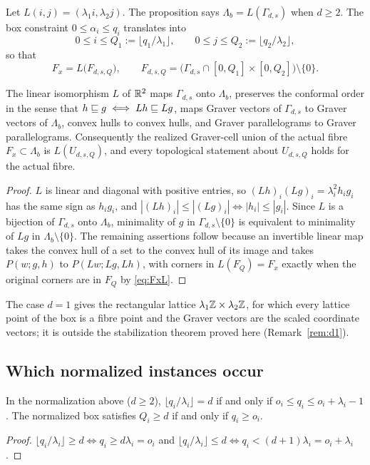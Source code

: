 Let $L(i,j)=(\lambda_1i,\lambda_2j)$. The proposition says $\Lambda_b=L(\Gamma_{d,s})$ when $d\ge2$. The box constraint $0\le\alpha_i\le q_i$ translates into
\[
  0\le i\le Q_1:=\lfloor q_1/\lambda_1\rfloor,\qquad 0\le j\le Q_2:=\lfloor q_2/\lambda_2\rfloor,
\]
so that
\begin{equation}\label{eq:FxL}
  F_x=L\bigl(F_{d,s,Q}\bigr),\qquad F_{d,s,Q}=\bigl(\Gamma_{d,s}\cap[0,Q_1]\times[0,Q_2]\bigr)\setminus\{0\}.
\end{equation}

\begin{proposition}[Transfer]\label{prop:transfer}
The linear isomorphism $L$ of $\mathbb R^2$ maps $\Gamma_{d,s}$ onto $\Lambda_b$, preserves the conformal order in the sense that $h\sqsubseteq g\iff Lh\sqsubseteq Lg$, maps Graver vectors of $\Gamma_{d,s}$ to Graver vectors of $\Lambda_b$, convex hulls to convex hulls, and Graver parallelograms to Graver parallelograms. Consequently the realized Graver-cell union of the actual fibre $F_x\subset\Lambda_b$ is $L(U_{d,s,Q})$, and every topological statement about $U_{d,s,Q}$ holds for the actual fibre.
\end{proposition}
\begin{proof}
$L$ is linear and diagonal with positive entries, so $(Lh)_i(Lg)_i=\lambda_i^2h_ig_i$ has the same sign as $h_ig_i$, and $|(Lh)_i|\le|(Lg)_i|\iff|h_i|\le|g_i|$. Since $L$ is a bijection of $\Gamma_{d,s}$ onto $\Lambda_b$, minimality of $g$ in $\Gamma_{d,s}\setminus\{0\}$ is equivalent to minimality of $Lg$ in $\Lambda_b\setminus\{0\}$. The remaining assertions follow because an invertible linear map takes the convex hull of a set to the convex hull of its image and takes $P(w;g,h)$ to $P(Lw;Lg,Lh)$, with corners in $L(F_Q)=F_x$ exactly when the original corners are in $F_Q$ by \eqref{eq:FxL}.
\end{proof}

The case $d=1$ gives the rectangular lattice $\lambda_1\mathbb Z\times\lambda_2\mathbb Z$, for which every lattice point of the box is a fibre point and the Graver vectors are the scaled coordinate vectors; it is outside the stabilization theorem proved here (Remark~\ref{rem:d1}).

\subsection{Which normalized instances occur}

\begin{corollary}\label{cor:plateau}
In the normalization above ($d\ge 2$), $\lfloor q_i/\lambda_i\rfloor= d$ if and only if $o_i\le q_i\le o_i+\lambda_i-1$. The normalized box satisfies $Q_i\ge d$ if and only if $q_i\ge o_i$.
\end{corollary}
\begin{proof}
$\lfloor q_i/\lambda_i\rfloor\ge d\iff q_i\ge d\lambda_i=o_i$ and $\lfloor q_i/\lambda_i\rfloor\le d\iff q_i<(d+1)\lambda_i=o_i+\lambda_i$.
\end{proof}


